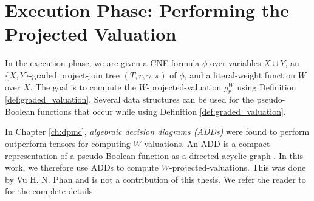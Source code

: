 \section{Execution Phase: Performing the Projected Valuation}
\label{sec:procount:execution}

In the execution phase, we are given a CNF formula $\phi$ over variables $X \cup Y$, an $\{X, Y\}$-graded project-join tree $(T, r, \gamma, \pi)$ of $\phi$, and a literal-weight function $W$ over $X$.
The goal is to compute the $W$-projected-valuation $g^W_r$ using Definition \ref{def:graded_valuation}.
Several data structures can be used for the pseudo-Boolean functions that occur while using Definition \ref{def:graded_valuation}.

In Chapter \ref{ch:dpmc}, \emph{algebraic decision diagrams (ADDs)} were found to perform outperform tensors for computing $W$-valuations.
An ADD is a compact representation of a pseudo-Boolean function as a directed acyclic graph \cite{bahar1997algebraic}.
In this work, we therefore use ADDs to compute $W$-projected-valuations.
This was done by Vu H. N. Phan and is not a contribution of this thesis. We refer the reader to \cite{phan2021phd} for the complete details.
